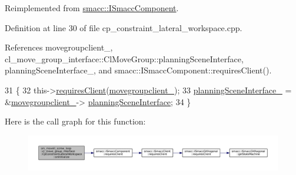 Reimplemented from \hyperlink{classsmacc_1_1ISmaccComponent_ae6f71d008db12553912e9436184b9e65}{smacc\+::\+I\+Smacc\+Component}.



Definition at line 30 of file cp\+\_\+constraint\+\_\+lateral\+\_\+workspace.\+cpp.



References movegroupclient\+\_\+, cl\+\_\+move\+\_\+group\+\_\+interface\+::\+Cl\+Move\+Group\+::planning\+Scene\+Interface, planning\+Scene\+Interface\+\_\+, and smacc\+::\+I\+Smacc\+Component\+::requires\+Client().


\begin{DoxyCode}
31         \{
32             this->\hyperlink{classsmacc_1_1ISmaccComponent_a36c085d906fbae0fcaee817aaeafebf4}{requiresClient}(\hyperlink{classsm__moveit__screw__loop_1_1cl__move__group__interface_1_1CpConstraintLateralWorkspace_a28b8261cc21cd75d50979cbbf0f4fd4c}{movegroupclient\_});
33             \hyperlink{classsm__moveit__screw__loop_1_1cl__move__group__interface_1_1CpConstraintLateralWorkspace_a0ff91498e2b0b4287c45d9a96ed8c237}{planningSceneInterface\_} = &\hyperlink{classsm__moveit__screw__loop_1_1cl__move__group__interface_1_1CpConstraintLateralWorkspace_a28b8261cc21cd75d50979cbbf0f4fd4c}{movegroupclient\_}->
      \hyperlink{classcl__move__group__interface_1_1ClMoveGroup_a11bfab580f36e2ad32c9b37d6f58f44c}{planningSceneInterface};
34         \}
\end{DoxyCode}
Here is the call graph for this function\+:
\nopagebreak
\begin{figure}[H]
\begin{center}
\leavevmode
\includegraphics[width=350pt]{classsm__moveit__screw__loop_1_1cl__move__group__interface_1_1CpConstraintLateralWorkspace_ab43b6ae4f92d8b5bf498e5538629f26f_cgraph}
\end{center}
\end{figure}
\mbox{\label{classsm__moveit__screw__loop_1_1cl__move__group__interface_1_1CpConstraintLateralWorkspace_a2c742726dc5d521fba7a357dc4ec3dac}} 
